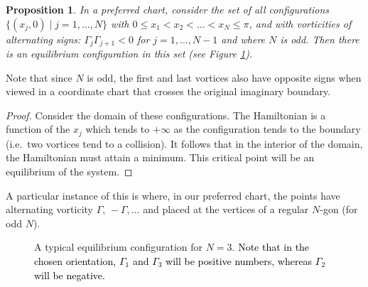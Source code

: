 \documentclass[11pt,twoside]{article}
\newtheorem{prop}[theorem]{Proposition}
\theoremstyle{definition}
\numberwithin{equation}{section}
\begin{document}
\begin{prop}\label{prop:equatorial equilibrium}
In a preferred chart, consider the set of all configurations $\{(x_j,0)\mid j=1,\dots,N\}$ with $0\leq x_1<x_2<\dots<x_N\leq \pi$, and with vorticities of alternating signs: $\Gamma_j\Gamma_{j+1}<0$ for $j=1,\dots,N-1$ and where $N$ is odd. Then there is an equilibrium configuration in this set (see Figure \ref{fig:N=3 equilibrium}).
\end{prop}

Note that since $N$ is odd, the first and last vortices also have opposite signs when viewed in a coordinate chart that crosses the original imaginary boundary. 

\begin{proof}
Consider the domain of these configurations.  The Hamiltonian is a function of the $x_j$ which tends to $+\infty$ as the configuration tends to the boundary (i.e.\ two vortices tend to a collision). It follows that in the interior of the domain, the Hamiltonian must attain a minimum. This critical point will be an equilibrium of the system.
\end{proof}

A particular instance of this is where, in our preferred chart, the points have alternating vorticity $\Gamma,\,-\Gamma,\dots$ and placed at the vertices of a regular $N$-gon (for odd $N$).


 \begin{figure}
     \centering
{}
      \caption{A typical equilibrium configuration for $N=3$. \textcolor{black}{Note that in the chosen orientation, $\Gamma_1$ and $\Gamma_3$ will be positive numbers, whereas $\Gamma_2$ will be negative. }}
     \label{fig:N=3 equilibrium}
 \end{figure}
\end{document}

